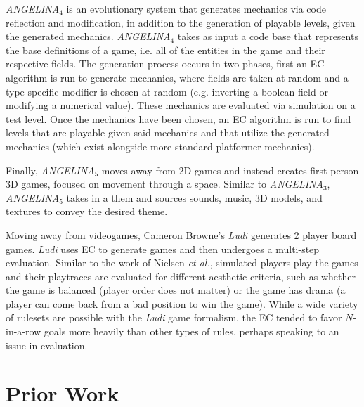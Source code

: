 \documentclass[12pt]{report}
\begin{document}
\textit{ANGELINA}$_{4}$ is an evolutionary system that generates mechanics via code reflection and modification, in addition to the generation of playable levels, given the generated mechanics.  \textit{ANGELINA}$_{4}$  takes as input a code base that represents the base definitions of a game, i.e. all of the entities in the game and their respective fields.  The generation process occurs in two phases, first an EC algorithm is run to generate mechanics, where fields are taken at random and a type specific modifier is chosen at random (e.g. inverting a boolean field or modifying a numerical value). These mechanics are evaluated via simulation on a test level.  Once the mechanics have been chosen, an EC algorithm is run to find levels that are playable given said mechanics and that utilize the generated mechanics (which exist alongside more standard platformer mechanics).

Finally, \textit{ANGELINA}$_{5}$ moves away from 2D games and instead creates first-person 3D games, focused on movement through a space.  Similar to \textit{ANGELINA}$_{3}$,  \textit{ANGELINA}$_{5}$ takes in a them and sources sounds, music, 3D models, and textures to convey the desired theme.

Moving away from videogames, Cameron Browne's   \textit{Ludi} \cite{Evolutionary Game Design} generates 2 player board games.  \textit{Ludi} uses EC to generate games and then undergoes a multi-step evaluation.  Similar to the work of Nielsen \textit{et al.}, simulated players play the games and their playtraces are evaluated for different aesthetic criteria, such as whether the game is balanced (player order does not matter) or the game has drama (a player can come back from a bad position to win the game). While a wide variety of rulesets are possible with the \textit{Ludi} game formalism, the EC tended to favor $N$-in-a-row goals more heavily than other types of rules, perhaps speaking to an issue in evaluation.

\section*{Prior Work}
\end{document}
